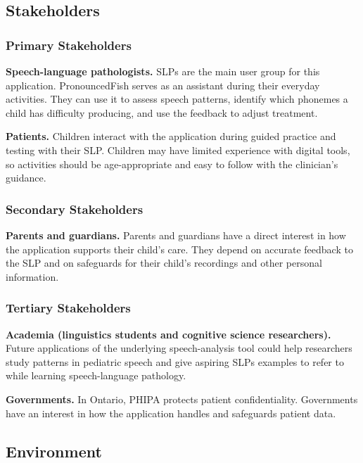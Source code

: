 \documentclass{article}
\begin{document}
\subsection{Stakeholders}

\subsubsection{Primary Stakeholders}
\textbf{Speech-language pathologists.} SLPs are the main user group for this
application. PronouncedFish serves as an assistant during their everyday
activities. They can use it to assess speech patterns, identify which phonemes
a child has difficulty producing, and use the feedback to adjust treatment.
\vspace{1.0em}

\noindent\textbf{Patients.} Children interact with the application during
guided practice and testing with their SLP. Children may have limited
experience with digital tools, so activities should be age-appropriate and
easy to follow with the clinician's guidance.

\subsubsection{Secondary Stakeholders}
\textbf{Parents and guardians.} Parents and guardians have a direct interest
in how the application supports their child's care. They depend on accurate
feedback to the SLP and on safeguards for their child's recordings and other
personal information.

\subsubsection{Tertiary Stakeholders}
\textbf{Academia (linguistics students and cognitive science researchers).}
Future applications of the underlying speech-analysis tool could help
researchers study patterns in pediatric speech and give aspiring SLPs
examples to refer to while learning speech-language pathology.
\vspace{1.0em}

\noindent\textbf{Governments.} In Ontario, PHIPA protects patient confidentiality.
Governments have an interest in how the application handles and safeguards
patient data.

\subsection{Environment}
\end{document}
